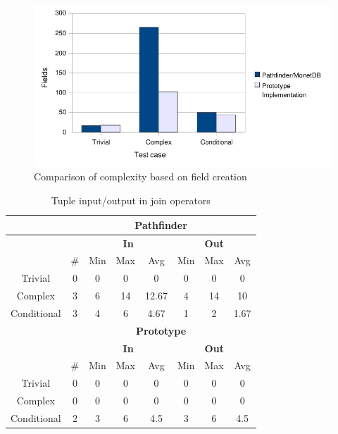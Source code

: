 \begin{figure}[!htp]
\begin{center}
  \includegraphics[width=1.0\textwidth]{diagrams/comparison_chart2_chart2}
  \caption{Comparison of complexity based on field creation}
  \label{fig:results:comparison:chart2}
\end{center}
\end{figure}

\begin{table}[!htp]
 \begin{center}
 \begin{tabular}{| c | c | c | c | c | c | c | c |}
  \hline
   & \multicolumn{7}{|c|}{\textbf{Pathfinder}} \\
   \hline
   &  & \multicolumn{3}{|c|}{\textbf{In}} &
   \multicolumn{3}{|c|}{\textbf{Out}}  \\
   \hline
   &  \# & Min & Max & Avg & Min & Max & Avg\\
   \hline
   Trivial & 0 & 0 & 0 & 0 & 0 & 0 & 0  \\
   \hline
   Complex & 3 & 6 & 14 & 12.67 & 4 & 14 & 10  \\
   \hline
   Conditional & 3 & 4 & 6 & 4.67 & 1 & 2 & 1.67  \\
   \hline
   & \multicolumn{7}{|c|}{\textbf{Prototype}} \\
   \hline
   &  & \multicolumn{3}{|c|}{\textbf{In}} & 
   \multicolumn{3}{|c|}{\textbf{Out}} \\
   \hline
   & \# & Min & Max & Avg & Min & Max & Avg \\ 
   \hline 
   Trivial & 0 & 0 & 0 & 0 & 0 & 0 & 0 \\
   \hline
   Complex & 0 & 0 & 0 & 0 & 0 & 0 & 0 \\
   \hline
   Conditional & 2 & 3 & 6 & 4.5 & 3 & 6 & 4.5 \\
   \hline
 \end{tabular}
\caption{Tuple input/output in join operators}
\label{table:result:complexity_matrix}
 \end{center}
\end{table}


